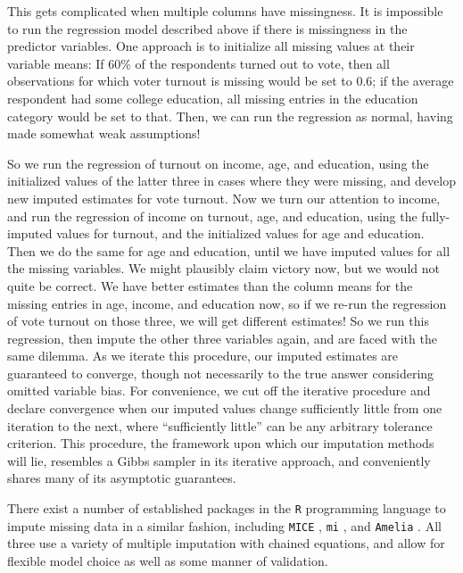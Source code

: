 \documentclass{article}
\begin{document}
This gets complicated when multiple columns have missingness. It is impossible to run the regression model described above if there is missingness in the predictor variables. One approach is to initialize all missing values at their variable means: If 60\% of the respondents turned out to vote, then all observations for which voter turnout is missing would be set to $0.6$; if the average respondent had some college education, all missing entries in the education category would be set to that. Then, we can run the regression as normal, having made somewhat weak assumptions!

So we run the regression of turnout on income, age, and education, using the initialized values of the latter three in cases where they were missing, and develop new imputed estimates for vote turnout. Now we turn our attention to income, and run the regression of income on turnout, age, and education, using the fully-imputed values for turnout, and the initialized values for age and education. Then we do the same for age and education, until we have imputed values for all the missing variables. We might plausibly claim victory now, but we would not quite be correct. We have better estimates than the column means for the missing entries in age, income, and education now, so if we re-run the regression of vote turnout on those three, we will get different estimates! So we run this regression, then impute the other three variables again, and are faced with the same dilemma. As we iterate this procedure, our imputed estimates are guaranteed to converge, though not necessarily to the true answer considering omitted variable bias. For convenience, we cut off the iterative procedure and declare convergence when our imputed values change sufficiently little from one iteration to the next, where ``sufficiently little'' can be any arbitrary tolerance criterion. This procedure, the framework upon which our imputation methods will lie, resembles a Gibbs sampler in its iterative approach, and conveniently shares many of its asymptotic guarantees. 

There exist a number of established packages in the \texttt{R} programming language to impute missing data in a similar fashion, including \texttt{MICE} \citep{buuren2011mice}, \texttt{mi} \citep{su2011multiple}, and \texttt{Amelia} \citep{honaker2011amelia}. All three use a variety of multiple imputation with chained equations, and allow for flexible model choice as well as some manner of validation. 
\end{document}

